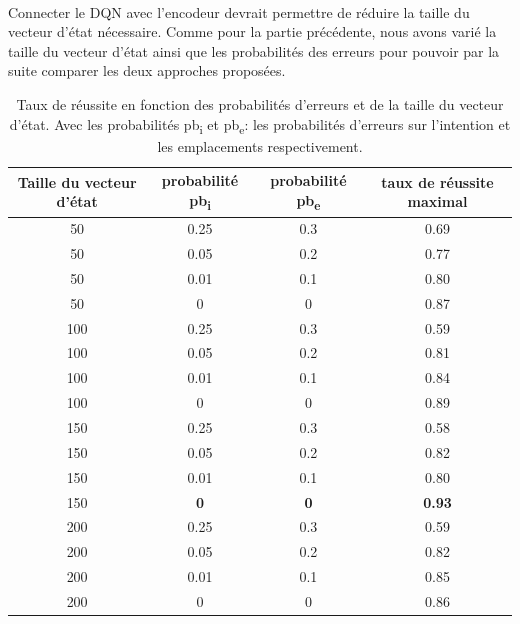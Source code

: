 \paragraph{} Connecter le DQN avec l'encodeur devrait permettre de réduire la taille du vecteur d'état nécessaire. Comme pour la partie précédente, nous avons varié la taille du vecteur d'état ainsi que les probabilités des erreurs pour pouvoir par la suite comparer les deux approches proposées. 
\begin{table}[H]
	\begin{center}
		
		\begin{tabular}{|c|c|c|c|}
			\hline
			\textbf{Taille du vecteur d'état} & \textbf{probabilité pb\textsubscript{i}} & \textbf{probabilité pb\textsubscript{e}} & \textbf{taux de réussite maximal}\\
			\hline
			50 & 0.25 & 0.3 & 0.69\\
			\hline
			50 & 0.05 & 0.2 & 0.77\\
			\hline
			50 & 0.01 & 0.1 & 0.80\\
			\hline
			50 & 0 & 0 & 0.87\\
			\hline
			100 & 0.25 & 0.3 & 0.59\\
			\hline
			100 & 0.05 & 0.2 & 0.81\\
			\hline
			100 & 0.01 & 0.1 & 0.84\\
			\hline
			100 & 0 & 0 & 0.89\\
			\hline
			150 & 0.25 & 0.3 & 0.58\\
			\hline
			150 & 0.05 & 0.2 & 0.82\\
			\hline
			150 & 0.01 & 0.1 & 0.80\\
			\hline
			150 & \textbf{0} & \textbf{0} & \textbf{0.93}\\
			\hline
			200 & 0.25 & 0.3 & 0.59\\
			\hline
			200 & 0.05 & 0.2 & 0.82\\
			\hline
			\rowcolor{LightCyan}
			200 & 0.01 & 0.1 & 0.85\\
			\hline
			200 & 0 & 0 & 0.86\\
			\hline
		\end{tabular}
		\caption{Taux de réussite en fonction des probabilités d'erreurs et de la taille du vecteur d'état. Avec les probabilités pb\textsubscript{i} et pb\textsubscript{e}: les probabilités d'erreurs sur l'intention et les emplacements respectivement.}\label{table_results_con}
	\end{center}
\end{table}
